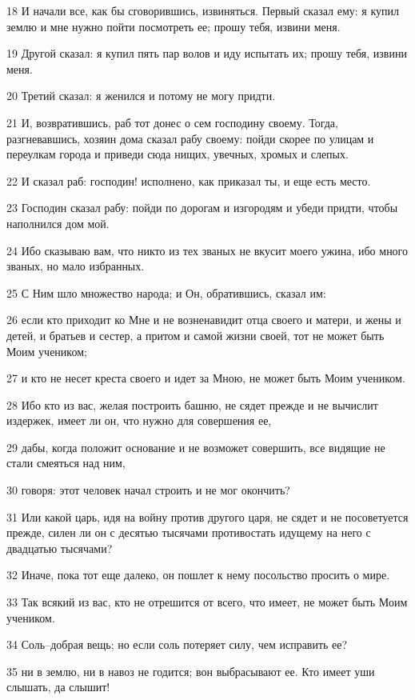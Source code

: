 \par 18 И начали все, как бы сговорившись, извиняться. Первый сказал ему: я купил землю и мне нужно пойти посмотреть ее; прошу тебя, извини меня.
\par 19 Другой сказал: я купил пять пар волов и иду испытать их; прошу тебя, извини меня.
\par 20 Третий сказал: я женился и потому не могу придти.
\par 21 И, возвратившись, раб тот донес о сем господину своему. Тогда, разгневавшись, хозяин дома сказал рабу своему: пойди скорее по улицам и переулкам города и приведи сюда нищих, увечных, хромых и слепых.
\par 22 И сказал раб: господин! исполнено, как приказал ты, и еще есть место.
\par 23 Господин сказал рабу: пойди по дорогам и изгородям и убеди придти, чтобы наполнился дом мой.
\par 24 Ибо сказываю вам, что никто из тех званых не вкусит моего ужина, ибо много званых, но мало избранных.
\par 25 С Ним шло множество народа; и Он, обратившись, сказал им:
\par 26 если кто приходит ко Мне и не возненавидит отца своего и матери, и жены и детей, и братьев и сестер, а притом и самой жизни своей, тот не может быть Моим учеником;
\par 27 и кто не несет креста своего и идет за Мною, не может быть Моим учеником.
\par 28 Ибо кто из вас, желая построить башню, не сядет прежде и не вычислит издержек, имеет ли он, что нужно для совершения ее,
\par 29 дабы, когда положит основание и не возможет совершить, все видящие не стали смеяться над ним,
\par 30 говоря: этот человек начал строить и не мог окончить?
\par 31 Или какой царь, идя на войну против другого царя, не сядет и не посоветуется прежде, силен ли он с десятью тысячами противостать идущему на него с двадцатью тысячами?
\par 32 Иначе, пока тот еще далеко, он пошлет к нему посольство просить о мире.
\par 33 Так всякий из вас, кто не отрешится от всего, что имеет, не может быть Моим учеником.
\par 34 Соль--добрая вещь; но если соль потеряет силу, чем исправить ее?
\par 35 ни в землю, ни в навоз не годится; вон выбрасывают ее. Кто имеет уши слышать, да слышит!

